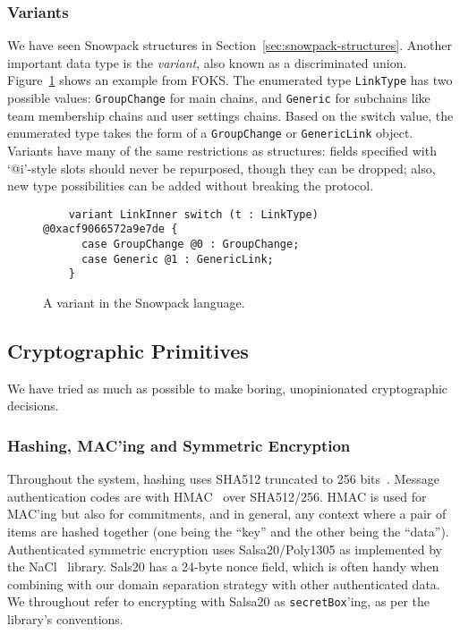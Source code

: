 \subsubsection{Variants}

We have seen Snowpack structures in Section~\ref{sec:snowpack-structures}. Another important
data type is the \textit{variant}, also known as a discriminated union. Figure~\ref{fig:link-inner}
shows an example from FOKS. The enumerated type \texttt{LinkType} has two possible values:
\texttt{GroupChange} for main chains, and \texttt{Generic} for subchains like team membership chains
and user settings chains. Based on the switch value, the enumerated type takes the form of 
a \texttt{GroupChange} or \texttt{GenericLink} object. Variants have many of the same restrictions
as structures: fields specified with `@i'-style slots should never be repurposed, though they 
can be dropped; also, new type possibilities can be added without breaking the protocol.

\begin{figure}[ht]
  \centering
  \begin{verbatim}
    variant LinkInner switch (t : LinkType) @0xacf9066572a9e7de {
      case GroupChange @0 : GroupChange;
      case Generic @1 : GenericLink;
    }\end{verbatim}
  \caption{A variant in the Snowpack language.}
  \label{fig:link-inner}
\end{figure}

\subsection{Cryptographic Primitives}
\label{sec:cryptography}

We have tried as much as possible to make boring, unopinionated cryptographic
decisions.

\subsubsection{Hashing, MAC'ing and Symmetric Encryption}

Throughout the system, hashing uses SHA512 truncated to 256 bits~\cite{rfc6234}.
Message authentication codes are with HMAC~\cite{rfc2104} over SHA512/256. HMAC
is used for MAC'ing but also for commitments, and in general, any context where
a pair of items are hashed together (one being the ``key'' and the other being
the ``data''). Authenticated symmetric encryption uses Salsa20/Poly1305 as
implemented by the NaCl~\cite{nacl} library. Sals20 has a 24-byte nonce field,
which is often handy when combining with our domain separation strategy with
other authenticated data. We throughout refer to encrypting with Salsa20 as
\texttt{secretBox}'ing, as per the library's conventions.

